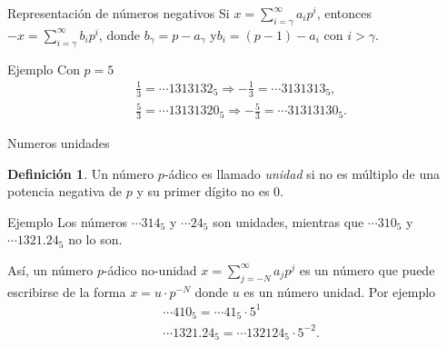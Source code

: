 \documentclass{beamer}
\theoremstyle{definition}
\numberwithin{equation}{section}
\newcommand{\marine}[1]{\textcolor{defColor}{#1}}
\newtheorem{df}{\marine{Definición}}
\begin{document}
\begin{frame}{Representación de números negativos}
	Si $x=\sum_{i=\gamma}^{\infty}a_ip^i$, entonces $-x=\sum_{i=\gamma}^{\infty}b_ip^i$, donde $b_\gamma = p-a_\gamma$ y\linebreak	 $b_i =  (p-1)-a_i$ con $i>\gamma$.
	
	
	
	\begin{exampleblock}{Ejemplo} Con $p=5$
		\begin{align*}
		&\frac{1}{3}=\cdots1313132_5 \Rightarrow -\frac{1}{3}=\cdots3131313_5,\\
		&\frac{5}{3}=\cdots13131320_5 \Rightarrow -\frac{5}{3}=\cdots31313130_5.
		\end{align*}
	\end{exampleblock}
\end{frame}

\begin{frame}{Numeros unidades}
	\begin{df}
		Un número $p$-ádico es llamado \textit{unidad} si no es múltiplo de una potencia negativa de $p$ y su primer dígito no es $0$.	
	\end{df}
	\begin{exampleblock}{Ejemplo}
		Los números $\cdots314_5$ y $\cdots24_5$ son unidades, mientras que $\cdots310_5$ y $\cdots1321.24_5$ no lo son.	
	\end{exampleblock}
	Así, un número $p$-ádico no-unidad $x=\sum_{j=-N}^{\infty} a_{j} p^{j}$ es un número que puede escribirse de la forma ${x=u\cdot p^{-N}}$ donde $u$ es un número unidad. Por ejemplo
	\begin{align*}
	&\cdots 410_5 = \cdots 41_5\cdot5^1\\
	&\cdots 1321.24_5 = \cdots 132124_5\cdot 5^{-2}.
	\end{align*}
\end{frame}
\end{document}
